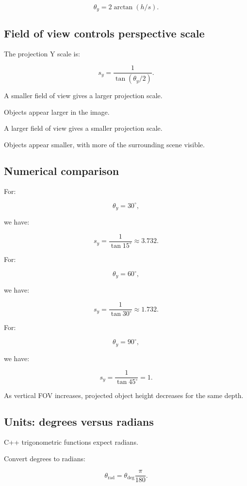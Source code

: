 \[
 \boxed{ \theta_y=2\arctan(h/s) }.
\]

\subsection{Field of view controls perspective scale}\label{02-foundations-ii-ch033-field-of-view-controls-perspective-scale}

The projection Y scale is:

\[
 \boxed{ s_y=\frac1{\tan(\theta_y/2)} }.
\]

A smaller field of view gives a larger projection scale.

Objects appear larger in the image.

A larger field of view gives a smaller projection scale.

Objects appear smaller, with more of the surrounding scene visible.

\subsection{Numerical comparison}\label{02-foundations-ii-ch033-numerical-comparison}

For:

\[
 \theta_y=30^\circ,
\]

we have:

\[
 s_y=\frac1{\tan15^\circ}\approx3.732.
\]

For:

\[
 \theta_y=60^\circ,
\]

we have:

\[
 s_y=\frac1{\tan30^\circ}\approx1.732.
\]

For:

\[
 \theta_y=90^\circ,
\]

we have:

\[
 s_y=\frac1{\tan45^\circ}=1.
\]

As vertical FOV increases, projected object height decreases for the same depth.

\subsection{Units: degrees versus radians}\label{02-foundations-ii-ch033-units-degrees-versus-radians}

C++ trigonometric functions expect radians.

Convert degrees to radians:

\[
 \boxed{ \theta_{\mathrm{rad}}= \theta_{\mathrm{deg}}\frac\pi{180} }.
\]

